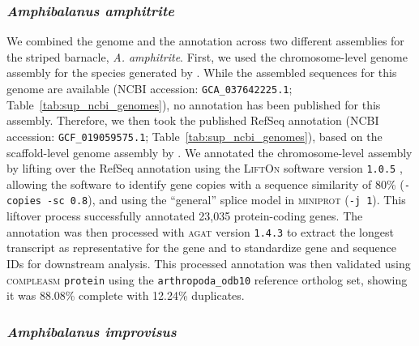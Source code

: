 \subsubsection*{\textit{Amphibalanus amphitrite}}

We combined the genome and the annotation across two different assemblies for the
striped barnacle, \textit{A. amphitrite}.
First, we used the chromosome-level genome assembly for the species generated by
\citet{han_new_2024}.
While the assembled sequences for this genome are available (NCBI accession:
\texttt{GCA\_037642225.1}; Table~\ref{tab:sup_ncbi_genomes}), no annotation has
been published for this assembly.
Therefore, we then took the published RefSeq annotation (NCBI accession:
\texttt{GCF\_019059575.1}; Table~\ref{tab:sup_ncbi_genomes}), based on the
scaffold-level genome assembly by \citet{kim_draft_2019}.
We annotated the chromosome-level assembly by lifting over the RefSeq annotation using
the \textsc{LiftOn} software version \texttt{1.0.5} \citep{chao_lifton_2024},
allowing the software to identify gene copies with a sequence similarity of 80\%
(\texttt{-copies -sc 0.8}), and using the ``general'' splice model in
\textsc{miniprot} (\texttt{-j 1}).
This liftover process successfully annotated 23{,}035 protein-coding genes.
The annotation was then processed with \textsc{agat} version \texttt{1.4.3} to
extract the longest transcript as representative for the gene and to standardize gene
and sequence IDs for downstream analysis.
This processed annotation was then validated using \textsc{compleasm} \texttt{protein}
using the \texttt{arthropoda\_odb10} reference ortholog set, showing it was 88.08\%
complete with 12.24\% duplicates.

\subsubsection*{\textit{Amphibalanus improvisus}}

